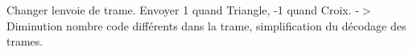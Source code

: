 
\begin{DoxyRefList}
\item[\label{todo__todo000001}%
\Hypertarget{todo__todo000001}%
Membre \hyperlink{class_bras_a197686a4ff55b4fe2384b2af44b8228b}{Bras\+:\+:leve\+Coude} (bool appuye)]Changer l\textquotesingle{}envoie de trame. Envoyer 1 quand Triangle, -\/1 quand Croix. -\/$>$ Diminution nombre code différents dans la trame, simplification du décodage des trames. 
\end{DoxyRefList}